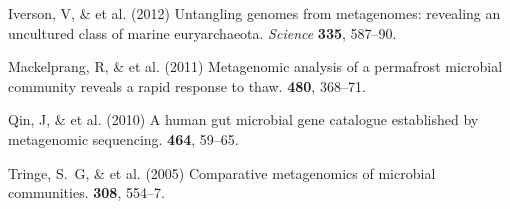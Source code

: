 \documentclass{pnastwo}
\begin{document}
\begin{article}
\begin{thebibliography}{10}


 Iverson, V, \& et al. \newblock (2012) Untangling genomes from
metagenomes: revealing an uncultured class of marine euryarchaeota. \newblock
{\em Science} {\bf 335}, 587--90.



 Mackelprang, R, \& et al.
\newblock (2011) Metagenomic analysis of a permafrost microbial community
reveals a rapid response to thaw.  {\bf 480}, 368--71.


 Qin, J, \& et al. \newblock
(2010) A human gut microbial gene catalogue established by metagenomic
sequencing.  {\bf 464}, 59--65.
%


 Tringe, S.~G, \& et al. \newblock (2005) Comparative
metagenomics of microbial communities.  {\bf 308},
554--7.
%
%



\end{thebibliography}
\end{article}
\end{document}
